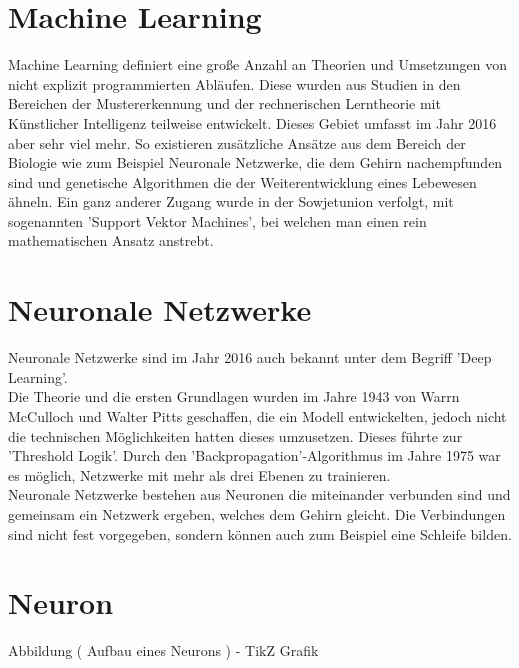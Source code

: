 \section{Machine Learning}
\label{sec:Machine Learning}

Machine Learning definiert eine große Anzahl an Theorien und Umsetzungen von nicht explizit programmierten Abläufen. 
Diese wurden aus Studien in den Bereichen der Mustererkennung und der rechnerischen Lerntheorie mit Künstlicher Intelligenz teilweise entwickelt. 
Dieses Gebiet umfasst im Jahr 2016 aber sehr viel mehr. 
So existieren zusätzliche Ansätze aus dem Bereich der Biologie wie zum Beispiel Neuronale Netzwerke, die dem Gehirn nachempfunden sind und genetische Algorithmen die der Weiterentwicklung eines Lebewesen ähneln. 
Ein ganz anderer Zugang wurde in der Sowjetunion verfolgt, mit sogenannten 'Support Vektor Machines', bei welchen man einen rein mathematischen Ansatz anstrebt.

\section{Neuronale Netzwerke}

Neuronale Netzwerke sind im Jahr 2016 auch bekannt unter dem Begriff 'Deep Learning'. \\

Die Theorie und die ersten Grundlagen wurden im Jahre 1943 von Warrn McCulloch und Walter Pitts geschaffen, die ein Modell entwickelten, jedoch nicht die technischen Möglichkeiten hatten dieses umzusetzen.
Dieses %
führte zur 'Threshold Logik'. 
Durch den 'Backpropagation'-Algorithmus im Jahre 1975 war es möglich, Netzwerke mit mehr als drei Ebenen zu trainieren. \\

Neuronale Netzwerke bestehen aus Neuronen die miteinander verbunden sind und gemeinsam ein Netzwerk ergeben, welches dem Gehirn gleicht. %
Die Verbindungen sind nicht fest vorgegeben, sondern können auch zum Beispiel eine Schleife bilden.


\section{Neuron}
\label{sec:Neuron}

Abbildung ( Aufbau eines Neurons ) - TikZ Grafik \\


